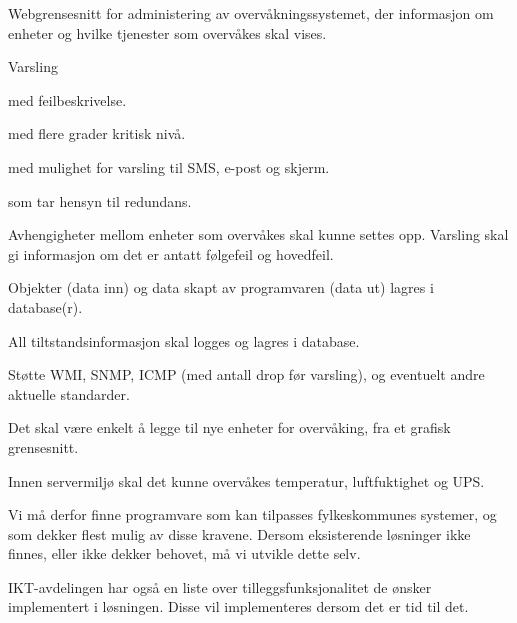 \begin{itemize*}
	\item Webgrensesnitt for administering av overvåkningssystemet, der informasjon om enheter og hvilke tjenester som overvåkes skal vises.
	\item Varsling
	\begin{itemize*} 
		\item med feilbeskrivelse.
		\item med flere grader kritisk nivå.
		\item med mulighet for varsling til SMS, e-post og skjerm.
		\item som tar hensyn til redundans.
	\end{itemize*}
	\item Avhengigheter mellom enheter som overvåkes skal kunne settes opp. Varsling skal gi informasjon om det er antatt følgefeil og hovedfeil.
	\item Objekter (data inn) og data skapt av programvaren (data ut) lagres i database(r).
	\item All tiltstandsinformasjon skal logges og lagres i database.
	\item Støtte WMI, SNMP, ICMP (med antall drop før varsling), og eventuelt andre aktuelle standarder.
	\item Det skal være enkelt å legge til nye enheter for overvåking, fra et grafisk grensesnitt.
	\item Innen servermiljø skal det kunne overvåkes temperatur, luftfuktighet og UPS.
\end{itemize*}

Vi må derfor finne programvare som kan tilpasses fylkeskommunes systemer, og som dekker flest mulig av disse kravene. Dersom eksisterende løsninger ikke finnes, eller ikke dekker behovet, må vi utvikle dette selv.

IKT-avdelingen har også en liste over tilleggsfunksjonalitet de ønsker implementert i løsningen. Disse vil implementeres dersom det er tid til det.

